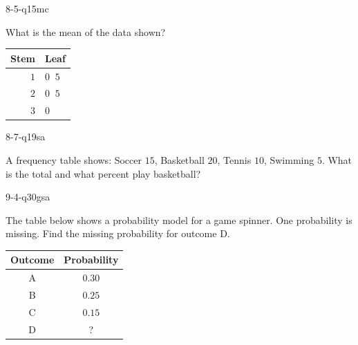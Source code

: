 \begin{practiceQuestion}{8-5-q15}{mc}
\begin{questionText}
What is the mean of the data shown?

\begin{center}
\begin{tabular}{r|l}
\textbf{Stem} & \textbf{Leaf} \\
\hline
$1$ & $0\;\;5$ \\
$2$ & $0\;\;5$ \\
$3$ & $0$
\end{tabular}
\end{center}
\end{questionText}
\end{practiceQuestion}

\begin{practiceQuestion}{8-7-q19}{sa}
\begin{questionText}
A frequency table shows: Soccer $15$, Basketball $20$, Tennis $10$, Swimming $5$. What is the total and what percent play basketball?
\end{questionText}
\end{practiceQuestion}

\begin{practiceQuestion}{9-4-q30}{gsa}
\begin{questionText}
The table below shows a probability model for a game spinner. One probability is missing. Find the missing probability for outcome D.

\begin{center}
\begin{tabular}{|c|c|}
\hline
\textbf{Outcome} & \textbf{Probability} \\
\hline
A & $0.30$ \\
\hline
B & $0.25$ \\
\hline
C & $0.15$ \\
\hline
D & ? \\
\hline
\end{tabular}
\end{center}
\end{questionText}
\end{practiceQuestion}

